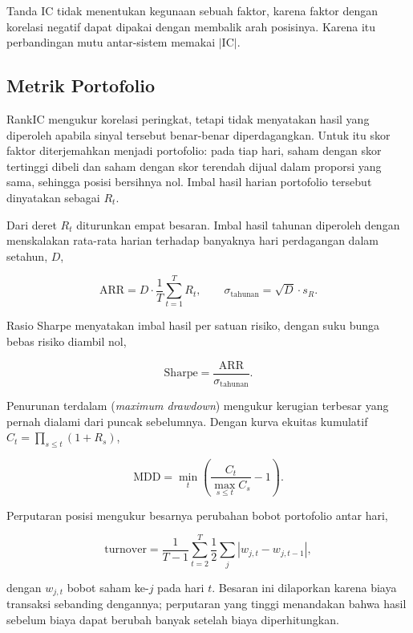 Tanda IC tidak menentukan kegunaan sebuah faktor, karena faktor dengan
korelasi negatif dapat dipakai dengan membalik arah posisinya. Karena itu
perbandingan mutu antar-sistem memakai $|\mathrm{IC}|$.

\subsection{Metrik Portofolio}

RankIC mengukur korelasi peringkat, tetapi tidak menyatakan hasil yang
diperoleh apabila sinyal tersebut benar-benar diperdagangkan. Untuk itu skor
faktor diterjemahkan menjadi portofolio: pada tiap hari, saham dengan skor
tertinggi dibeli dan saham dengan skor terendah dijual dalam proporsi yang
sama, sehingga posisi bersihnya nol. Imbal hasil harian portofolio tersebut
dinyatakan sebagai $R_t$.

Dari deret $R_t$ diturunkan empat besaran. Imbal hasil tahunan diperoleh
dengan menskalakan rata-rata harian terhadap banyaknya hari perdagangan dalam
setahun, $D$,

\begin{equation}
    \mathrm{ARR} = D\cdot\frac{1}{T}\sum_{t=1}^{T} R_t ,
    \qquad
    \sigma_{\text{tahunan}} = \sqrt{D}\cdot s_R .
\end{equation}

Rasio Sharpe menyatakan imbal hasil per satuan risiko, dengan suku bunga bebas
risiko diambil nol,

\begin{equation}
    \mathrm{Sharpe} = \frac{\mathrm{ARR}}{\sigma_{\text{tahunan}}} .
\end{equation}

Penurunan terdalam (\textit{maximum drawdown}) mengukur kerugian terbesar yang
pernah dialami dari puncak sebelumnya. Dengan kurva ekuitas kumulatif $C_t =
\prod_{s\le t}(1+R_s)$,

\begin{equation}
    \mathrm{MDD} = \min_{t}
    \left( \frac{C_t}{\max_{s\le t} C_s} - 1 \right).
\end{equation}

Perputaran posisi mengukur besarnya perubahan bobot portofolio antar hari,

\begin{equation}
    \mathrm{turnover} = \frac{1}{T-1}\sum_{t=2}^{T}
    \frac{1}{2}\sum_{j} \left| w_{j,t} - w_{j,t-1} \right| ,
\end{equation}

dengan $w_{j,t}$ bobot saham ke-$j$ pada hari $t$. Besaran ini dilaporkan
karena biaya transaksi sebanding dengannya; perputaran yang tinggi menandakan
bahwa hasil sebelum biaya dapat berubah banyak setelah biaya diperhitungkan.
